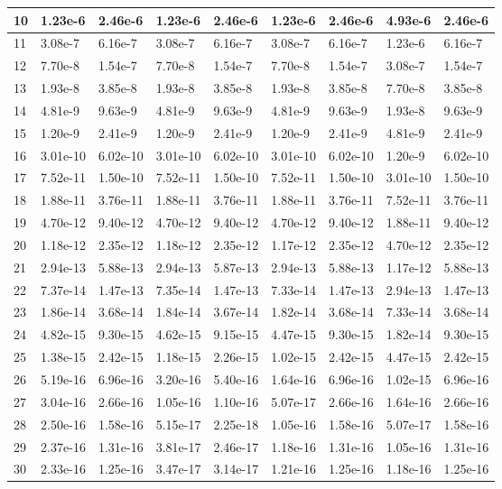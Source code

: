 \documentclass[soc]{gzwroc} %
\begin{document}
\begin{table}[h!]
\begin{tabular}{|l|l|l|l|l|l|l|l|l|}
10 & 1.23e-6 & 2.46e-6 & 1.23e-6 & 2.46e-6 & 1.23e-6 & 2.46e-6 & 4.93e-6 & 2.46e-6 \\ \hline 
11 & 3.08e-7 & 6.16e-7 & 3.08e-7 & 6.16e-7 & 3.08e-7 & 6.16e-7 & 1.23e-6 & 6.16e-7 \\ \hline 
12 & 7.70e-8 & 1.54e-7 & 7.70e-8 & 1.54e-7 & 7.70e-8 & 1.54e-7 & 3.08e-7 & 1.54e-7 \\ \hline 
13 & 1.93e-8 & 3.85e-8 & 1.93e-8 & 3.85e-8 & 1.93e-8 & 3.85e-8 & 7.70e-8 & 3.85e-8 \\ \hline 
14 & 4.81e-9 & 9.63e-9 & 4.81e-9 & 9.63e-9 & 4.81e-9 & 9.63e-9 & 1.93e-8 & 9.63e-9 \\ \hline 
15 & 1.20e-9 & 2.41e-9 & 1.20e-9 & 2.41e-9 & 1.20e-9 & 2.41e-9 & 4.81e-9 & 2.41e-9 \\ \hline 
16 & 3.01e-10 & 6.02e-10 & 3.01e-10 & 6.02e-10 & 3.01e-10 & 6.02e-10 & 1.20e-9 & 6.02e-10 \\ \hline 
17 & 7.52e-11 & 1.50e-10 & 7.52e-11 & 1.50e-10 & 7.52e-11 & 1.50e-10 & 3.01e-10 & 1.50e-10 \\ \hline 
18 & 1.88e-11 & 3.76e-11 & 1.88e-11 & 3.76e-11 & 1.88e-11 & 3.76e-11 & 7.52e-11 & 3.76e-11 \\ \hline 
19 & 4.70e-12 & 9.40e-12 & 4.70e-12 & 9.40e-12 & 4.70e-12 & 9.40e-12 & 1.88e-11 & 9.40e-12 \\ \hline 
20 & 1.18e-12 & 2.35e-12 & 1.18e-12 & 2.35e-12 & 1.17e-12 & 2.35e-12 & 4.70e-12 & 2.35e-12 \\ \hline 
21 & 2.94e-13 & 5.88e-13 & 2.94e-13 & 5.87e-13 & 2.94e-13 & 5.88e-13 & 1.17e-12 & 5.88e-13 \\ \hline 
22 & 7.37e-14 & 1.47e-13 & 7.35e-14 & 1.47e-13 & 7.33e-14 & 1.47e-13 & 2.94e-13 & 1.47e-13 \\ \hline 
23 & 1.86e-14 & 3.68e-14 & 1.84e-14 & 3.67e-14 & 1.82e-14 & 3.68e-14 & 7.33e-14 & 3.68e-14 \\ \hline 
24 & 4.82e-15 & 9.30e-15 & 4.62e-15 & 9.15e-15 & 4.47e-15 & 9.30e-15 & 1.82e-14 & 9.30e-15 \\ \hline 
25 & 1.38e-15 & 2.42e-15 & 1.18e-15 & 2.26e-15 & 1.02e-15 & 2.42e-15 & 4.47e-15 & 2.42e-15 \\ \hline 
26 & 5.19e-16 & 6.96e-16 & 3.20e-16 & 5.40e-16 & 1.64e-16 & 6.96e-16 & 1.02e-15 & 6.96e-16 \\ \hline 
27 & 3.04e-16 & 2.66e-16 & 1.05e-16 & 1.10e-16 & 5.07e-17 & 2.66e-16 & 1.64e-16 & 2.66e-16 \\ \hline 
28 & 2.50e-16 & 1.58e-16 & 5.15e-17 & 2.25e-18 & 1.05e-16 & 1.58e-16 & 5.07e-17 & 1.58e-16 \\ \hline 
29 & 2.37e-16 & 1.31e-16 & 3.81e-17 & 2.46e-17 & 1.18e-16 & 1.31e-16 & 1.05e-16 & 1.31e-16 \\ \hline 
30 & 2.33e-16 & 1.25e-16 & 3.47e-17 & 3.14e-17 & 1.21e-16 & 1.25e-16 & 1.18e-16 & 1.25e-16 \\ \hline 
\end{tabular}
\end{table}
\end{document}
